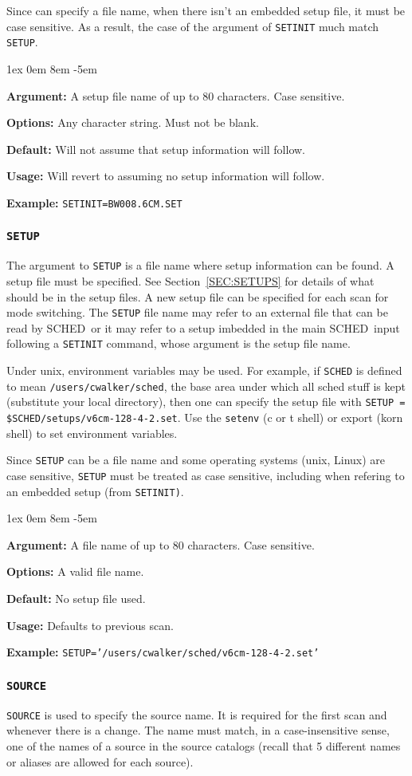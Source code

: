 \documentclass{report}
\newcommand{\schedb}{{\sc SCHED~}}
\newcommand{\rcwbox}[5]{
  \begin{list}{}{\parsep 1ex  \itemsep 0em
                 \leftmargin 8em  \itemindent -5em }
    \item {\bf Argument:} #1
    \item {\bf Options:}  #2
    \item {\bf Default:}  #3
    \item {\bf Usage:}    #4
    \item {\bf Example:}  #5
  \end{list}
}
\begin{document}
Since  can specify a file name, when
there isn't an embedded setup file, it must be case sensitive.  As
a result, the case of the argument of {\tt SETINIT} much match
{\tt SETUP}.

\rcwbox
{A setup file name of up to 80 characters. Case sensitive.}
{Any character string.  Must not be blank.}
{Will not assume that setup information will follow.}
{Will revert to assuming no setup information will follow.}
{{\tt SETINIT=BW008.6CM.SET}}

\subsubsection{\label{MP:SETUP}{\tt SETUP}}

The argument to {\tt SETUP} is a file name where setup information can
be found.  A setup file must be specified.
See Section~\ref{SEC:SETUPS} for details of what should be in
the setup files. A new setup file can be specified for each scan for
mode switching.  The {\tt SETUP} file name may refer to an external
file that can be read by \schedb or it may refer to a setup
imbedded in the main \schedb input following a {\tt SETINIT}
command, whose argument is the setup file name.

Under unix, environment variables may be used.  For example, if
{\tt SCHED} is defined to mean {\tt /users/cwalker/sched}, the
base area under which all sched stuff is kept (substitute your
local directory), then one can specify the setup file with
{\tt SETUP = \$SCHED/setups/v6cm-128-4-2.set}.  Use the {\tt setenv}
(c or t shell) or export (korn shell) to set environment variables.

Since {\tt SETUP} can be a file name and some operating systems (unix,
Linux) are case sensitive, {\tt SETUP} must be treated as case sensitive,
including when refering to an embedded setup (from {\tt SETINIT)}.

\rcwbox
{A file name of up to 80 characters.  Case sensitive.}
{A valid file name.}
{No setup file used.}
{Defaults to previous scan.}
{{\tt SETUP='/users/cwalker/sched/v6cm-128-4-2.set'}}


\subsubsection{\label{MP:SOURCE}{\tt SOURCE}}

{\tt SOURCE} is used to specify the source name.  It is required for
the first scan and whenever there is a change. The name must match, in
a case-insensitive sense, one of the names of a source in the source
catalogs (recall that 5 different names or aliases are allowed for
each source).
\end{document}

